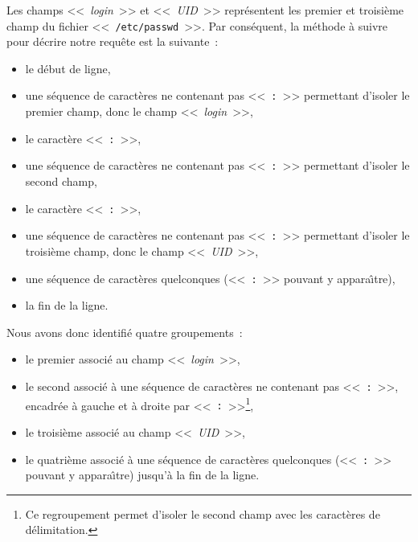 Les champs <<~{\sl login}~>> et <<~{\sl UID}~>> repr{\'e}sentent les premier et
troisi{\`e}me champ du fichier <<~{\tt /etc/passwd}~>>. Par cons{\'e}quent, la m{\'e}thode
{\`a} suivre pour d{\'e}crire notre requ{\^e}te est la suivante~:
\begin{itemize}
	\item	le d{\'e}but de ligne,\\[2ex]
	\item	une s{\'e}quence de caract{\`e}res ne contenant pas <<~{\tt :}~>> permettant
			d'isoler le premier champ, donc le champ <<~{\sl login}~>>,\\[2ex]
	\item	le caract{\`e}re <<~{\tt :}~>>,\\[2ex]
	\item	une s{\'e}quence de caract{\`e}res ne contenant pas <<~{\tt :}~>> permettant
			d'isoler le second champ,\\[2ex]
	\item	le caract{\`e}re <<~{\tt :}~>>,\\[2ex]
	\item	une s{\'e}quence de caract{\`e}res ne contenant pas <<~{\tt :}~>> permettant
			d'isoler le troisi{\`e}me  champ, donc le champ <<~{\sl UID}~>>,\\[2ex]
	\item	une s{\'e}quence de caract{\`e}res quelconques (<<~{\tt :}~>> pouvant y
			appara{\^\i}tre),\\[2ex]
	\item	la fin de la ligne.
\end{itemize}
Nous avons donc identifi{\'e} quatre groupements~:
\begin{itemize}
	\item	le premier associ{\'e} au champ <<~{\sl login}~>>,\\[2ex]
	\item	le second associ{\'e} {\`a} une s{\'e}quence de caract{\`e}res ne
			contenant pas <<~{\tt :}~>>, encadr{\'e}e {\`a} gauche et {\`a} droite par
			<<~{\tt :}~>>\footnote{Ce regroupement permet d'isoler le second
			champ avec les caract{\`e}res de d{\'e}limitation.},\\[2ex]
	\item	le troisi{\`e}me associ{\'e} au champ <<~{\sl UID}~>>,\\[2ex]
	\item	le quatri{\`e}me associ{\'e} {\`a} une s{\'e}quence de caract{\`e}res quelconques
			(<<~{\tt :}~>> pouvant y appara{\^\i}tre) jusqu'{\`a} la fin de la ligne.
\end{itemize}

